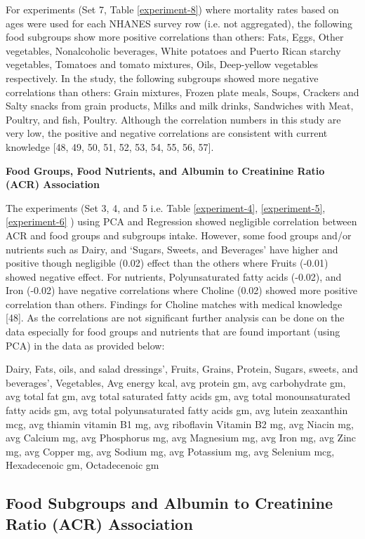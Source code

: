 \noindent For experiments (Set 7, Table \ref{experiment-8}) where mortality rates based on ages were used for each NHANES survey row (i.e. not aggregated), the following food subgroups show more positive correlations than others: Fats, Eggs, Other vegetables, Nonalcoholic beverages, White potatoes and Puerto Rican starchy vegetables, Tomatoes and tomato mixtures, Oils, Deep-yellow vegetables respectively. In the study, the following subgroups showed more negative correlations than others: Grain mixtures, Frozen plate meals, Soups, Crackers and Salty snacks from grain products, Milks and milk drinks, Sandwiches with Meat, Poultry, and fish, Poultry. Although the correlation numbers in this study are very low, the positive and negative correlations are consistent with current knowledge [48, 49, 50, 51, 52, 53, 54, 55, 56, 57].

\noindent \textbf{Food Groups, Food Nutrients, and Albumin to Creatinine Ratio (ACR) Association}

\noindent The experiments (Set 3, 4, and 5 i.e. Table \ref{experiment-4}, \ref{experiment-5}, \ref{experiment-6} ) using PCA and Regression showed negligible correlation between ACR and food groups and subgroups intake. However, some food groups and/or nutrients such as Dairy, and  `Sugars, Sweets, and Beverages'  have higher and positive though negligible (0.02) effect than the others where Fruits (-0.01) showed negative effect.  For nutrients, Polyunsaturated fatty acids (-0.02), and Iron (-0.02) have negative correlations where Choline (0.02) showed more positive correlation than others. Findings for Choline matches with medical knowledge [48]. As the correlations are not significant further analysis can be done on the data especially for food groups and nutrients that are found important (using PCA) in the data as provided below:

\noindent Dairy,  Fats, oils, and salad dressings’,  Fruits,  Grains,  Protein,   Sugars, sweets, and beverages’, Vegetables, Avg energy kcal,  avg protein gm,  avg carbohydrate gm,  avg total fat gm,  avg total saturated fatty acids gm, avg total monounsaturated fatty acids gm,  avg total polyunsaturated fatty acids gm, avg lutein zeaxanthin mcg,  avg thiamin vitamin B1 mg,  avg riboflavin Vitamin B2 mg,  avg Niacin mg, avg Calcium mg,  avg Phosphorus mg,  avg Magnesium mg,  avg Iron mg, avg Zinc mg,  avg Copper mg,  avg Sodium mg,  avg Potassium mg,  avg Selenium mcg,  Hexadecenoic gm,  Octadecenoic gm

\subsection{Food Subgroups and Albumin to Creatinine Ratio (ACR) Association}

